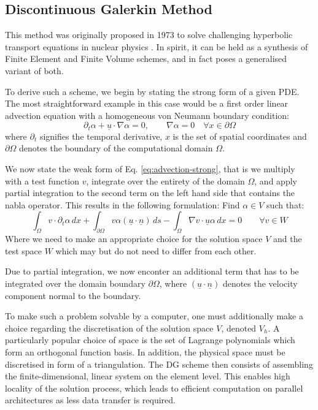 \documentclass[sn-mathphys,Numbered]{sn-jnl}%
\theoremstyle{thmstyleone}%
\theoremstyle{thmstyletwo}%
\theoremstyle{thmstylethree}%
\begin{document}
\subsection{Discontinuous Galerkin Method}

This method was originally proposed in 1973 to solve challenging hyperbolic transport equations in nuclear physics \cite{osti_4491151}.
In spirit, it can be held as a synthesis of Finite Element and Finite Volume schemes, and in fact poses a generalised variant of both.

To derive such a scheme, we begin by stating the strong form of a given PDE. The most straightforward example in this case would be a first order linear advection equation with a homogeneous von Neumann boundary condition:
\begin{equation} \label{eq:advection-strong}
    \partial_t \alpha + \underline{u} \cdot \nabla \alpha = 0, \qquad \nabla \alpha = 0 \quad\forall x \in \partial \Omega
\end{equation}
where $\partial_t$ signifies the temporal derivative, $x$ is the set of spatial coordinates and $\partial \Omega$ denotes the boundary of the computational domain $\Omega$.

We now state the weak form of Eq. \ref{eq:advection-strong}, that is we multiply with a test function $v$, integrate over the entirety of the domain $\Omega$, and apply partial integration to the second term on the left hand side that contains the nabla operator.
This results in the following formulation: Find $\alpha \in V$ such that:
\begin{equation}\label{eq:advection-weak-dgm}
    \int_\Omega v \cdot \partial_t \alpha \,dx + \int_{\partial \Omega} v \alpha (\underline{u}\cdot \underline{n}) \,ds - \int_\Omega \nabla v \cdot \underline{u} \alpha \,dx = 0 \qquad \forall v \in W
\end{equation}
Where we need to make an appropriate choice for the solution space $V$ and the test space $W$ which may but do not need to differ from each other.

Due to partial integration, we now enconter an additional term that has to be integrated over the domain boundary $\partial \Omega$, where $(\underline{u}\cdot \underline{n})$ denotes the velocity component normal to the boundary.

To make such a problem solvable by a computer, one must additionally make a choice regarding the discretisation of the solution space $V$, denoted $V_h$.
A particularly popular choice of space is the set of Lagrange polynomials which form an orthogonal function basis.
In addition, the physical space must be discretised in form of a triangulation.
The DG scheme then consists of assembling the finite-dimensional, linear system on the element level.
This enables high locality of the solution process, which leads to efficient computation on parallel architectures as less data transfer is required.
\end{document}
